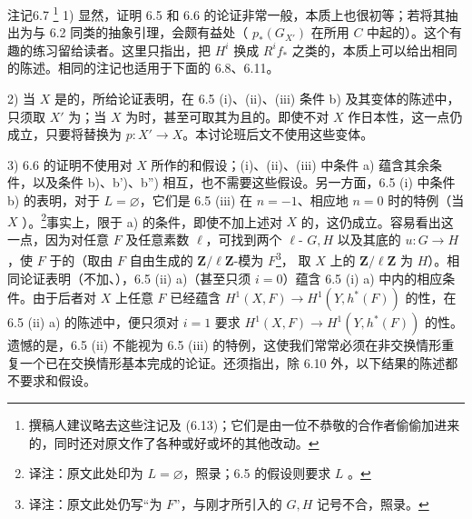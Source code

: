 \begin{SGAresult}{注记}{6.7}
\footnote{撰稿人建议略去这些注记及 (6.13)；它们是由一位不恭敬的合作者偷偷加进来的，同时还对原文作了各种或好或坏的其他改动。}
1) 显然，证明 6.5 和 6.6 的论证非常一般，本质上也很初等；若将其抽出为与 6.2 同类的抽象引理，会颇有益处（ $p_*(G_{X'})$ 在所用 $C$ 中起的）。这个有趣的练习留给读者。这里只指出，把 $H^i$ 换成 $R^if_*$ 之类的，本质上可以给出相同的陈述。相同的注记也适用于下面的 6.8、6.11。

2) 当 $X$ 是的，所给论证表明，在 6.5 (i)、(ii)、(iii) 条件 b) 及其变体的陈述中，只须取 $X'$ 为；当 $X$ 为时，甚至可取其为且的。即使不对 $X$ 作日本性，这一点仍成立，只要将替换为 $p:X'\to X$。本讨论班后文不使用这些变体。

3) 6.6 的证明不使用对 $X$ 所作的和假设；(i)、(ii)、(iii) 中条件 a) 蕴含其余条件，以及条件 b)、b')、b'') 相互，也不需要这些假设。另一方面，6.5 (i) 中条件 b) 的表明，对于 $L=\varnothing$，它们是 6.5 (iii) 在 $n=-1$、相应地 $n=0$ 时的特例（当 $X$ ）。\footnote{译注：原文此处印为 $L=\varnothing$，照录；6.5 的假设则要求 $L$ 。}事实上，限于 a) 的条件，即使不加上述对 $X$ 的，这仍成立。容易看出这一点，因为对任意 $F$ 及任意素数 $\ell$，可找到两个 $\ell$- $G,H$ 以及其底的 $u:G\to H$，使 $F$ 于的（取由 $F$ 自由生成的 $\mathbf Z/\ell\mathbf Z$-模为 $F$\footnote{译注：原文此处仍写“为 $F$”，与刚才所引入的 $G,H$ 记号不合，照录。}，
取 $X$ 上的 $\mathbf Z/\ell\mathbf Z$ 为 $H$）。相同论证表明（不加、），6.5 (ii) a)（甚至只须 $i=0$）蕴含 6.5 (i) a) 中内的相应条件。由于后者对 $X$ 上任意 $F$ 已经蕴含 $H^1(X,F)\to H^1(Y,h^*(F))$ 的性，在 6.5 (ii) a) 的陈述中，便只须对 $i=1$ 要求 $H^1(X,F)\to H^1(Y,h^*(F))$ 的性。遗憾的是，6.5 (ii) 不能视为 6.5 (iii) 的特例，这使我们常常必须在非交换情形重复一个已在交换情形基本完成的论证。还须指出，除 6.10 外，以下结果的陈述都不要求和假设。
\end{SGAresult}

